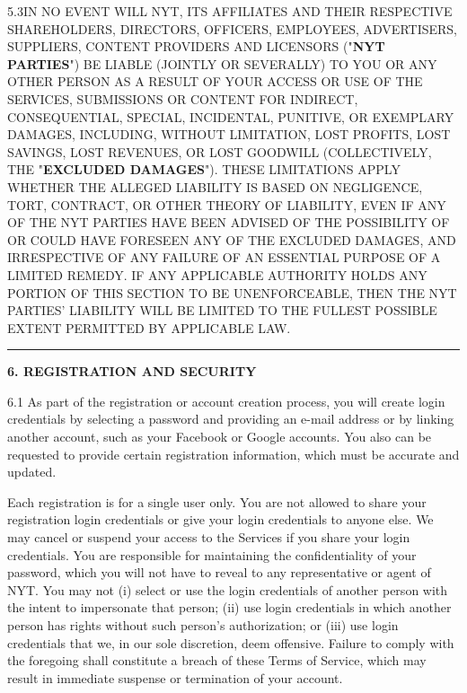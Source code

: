 5.3IN NO EVENT WILL NYT, ITS AFFILIATES AND THEIR RESPECTIVE
SHAREHOLDERS, DIRECTORS, OFFICERS, EMPLOYEES, ADVERTISERS, SUPPLIERS,
CONTENT PROVIDERS AND LICENSORS ("\textbf{NYT PARTIES}") BE LIABLE
(JOINTLY OR SEVERALLY) TO YOU OR ANY OTHER PERSON AS A RESULT OF YOUR
ACCESS OR USE OF THE SERVICES, SUBMISSIONS OR CONTENT FOR INDIRECT,
CONSEQUENTIAL, SPECIAL, INCIDENTAL, PUNITIVE, OR EXEMPLARY DAMAGES,
INCLUDING, WITHOUT LIMITATION, LOST PROFITS, LOST SAVINGS, LOST
REVENUES, OR LOST GOODWILL (COLLECTIVELY, THE "\textbf{EXCLUDED
DAMAGES}"). THESE LIMITATIONS APPLY WHETHER THE ALLEGED LIABILITY IS
BASED ON NEGLIGENCE, TORT, CONTRACT, OR OTHER THEORY OF LIABILITY, EVEN
IF ANY OF THE NYT PARTIES HAVE BEEN ADVISED OF THE POSSIBILITY OF OR
COULD HAVE FORESEEN ANY OF THE EXCLUDED DAMAGES, AND IRRESPECTIVE OF ANY
FAILURE OF AN ESSENTIAL PURPOSE OF A LIMITED REMEDY. IF ANY APPLICABLE
AUTHORITY HOLDS ANY PORTION OF THIS SECTION TO BE UNENFORCEABLE, THEN
THE NYT PARTIES' LIABILITY WILL BE LIMITED TO THE FULLEST POSSIBLE
EXTENT PERMITTED BY APPLICABLE LAW.

\begin{center}\rule{0.5\linewidth}{\linethickness}\end{center}

\textbf{6. REGISTRATION AND SECURITY}

6.1 As part of the registration or account creation process, you will
create login credentials by selecting a password and providing an e-mail
address or by linking another account, such as your Facebook or Google
accounts. You also can be requested to provide certain registration
information, which must be accurate and updated.

Each registration is for a single user only. You are not allowed to
share your registration login credentials or give your login credentials
to anyone else. We may cancel or suspend your access to the Services if
you share your login credentials. You are responsible for maintaining
the confidentiality of your password, which you will not have to reveal
to any representative or agent of NYT. You may not (i) select or use the
login credentials of another person with the intent to impersonate that
person; (ii) use login credentials in which another person has rights
without such person's authorization; or (iii) use login credentials that
we, in our sole discretion, deem offensive. Failure to comply with the
foregoing shall constitute a breach of these Terms of Service, which may
result in immediate suspense or termination of your account.

